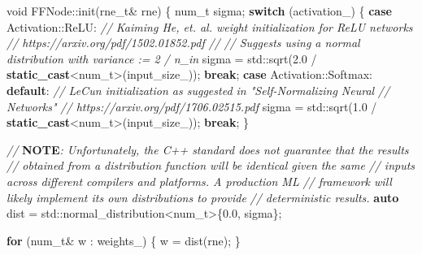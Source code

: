 \documentclass[
]{article}
\newenvironment{Shaded}{}{}
\newcommand{\AlertTok}[1]{\textcolor[rgb]{1.00,0.00,0.00}{\textbf{#1}}}
\newcommand{\BuiltInTok}[1]{#1}
\newcommand{\CommentTok}[1]{\textcolor[rgb]{0.38,0.63,0.69}{\textit{#1}}}
\newcommand{\ControlFlowTok}[1]{\textcolor[rgb]{0.00,0.44,0.13}{\textbf{#1}}}
\newcommand{\DataTypeTok}[1]{\textcolor[rgb]{0.56,0.13,0.00}{#1}}
\newcommand{\FloatTok}[1]{\textcolor[rgb]{0.25,0.63,0.44}{#1}}
\newcommand{\KeywordTok}[1]{\textcolor[rgb]{0.00,0.44,0.13}{\textbf{#1}}}
\newcommand{\NormalTok}[1]{#1}
\newcommand{\VariableTok}[1]{\textcolor[rgb]{0.10,0.09,0.49}{#1}}
\begin{document}
\begin{Shaded}
\begin{Highlighting}[]
\DataTypeTok{void}\NormalTok{ FFNode::init(}\DataTypeTok{rne\_t}\NormalTok{\& rne)}
\NormalTok{\{}
    \DataTypeTok{num\_t}\NormalTok{ sigma;}
    \ControlFlowTok{switch}\NormalTok{ (}\VariableTok{activation\_}\NormalTok{)}
\NormalTok{    \{}
    \ControlFlowTok{case}\NormalTok{ Activation::ReLU:}
        \CommentTok{// Kaiming He, et. al. weight initialization for ReLU networks}
        \CommentTok{// https://arxiv.org/pdf/1502.01852.pdf}
        \CommentTok{//}
        \CommentTok{// Suggests using a normal distribution with variance := 2 / n\_in}
\NormalTok{        sigma = }\BuiltInTok{std::}\NormalTok{sqrt(}\FloatTok{2.0}\NormalTok{ / }\KeywordTok{static\_cast}\NormalTok{\textless{}}\DataTypeTok{num\_t}\NormalTok{\textgreater{}(}\VariableTok{input\_size\_}\NormalTok{));}
        \ControlFlowTok{break}\NormalTok{;}
    \ControlFlowTok{case}\NormalTok{ Activation::Softmax:}
    \ControlFlowTok{default}\NormalTok{:}
        \CommentTok{// LeCun initialization as suggested in "Self{-}Normalizing Neural}
        \CommentTok{// Networks"}
        \CommentTok{// https://arxiv.org/pdf/1706.02515.pdf}
\NormalTok{        sigma = }\BuiltInTok{std::}\NormalTok{sqrt(}\FloatTok{1.0}\NormalTok{ / }\KeywordTok{static\_cast}\NormalTok{\textless{}}\DataTypeTok{num\_t}\NormalTok{\textgreater{}(}\VariableTok{input\_size\_}\NormalTok{));}
        \ControlFlowTok{break}\NormalTok{;}
\NormalTok{    \}}

    \CommentTok{// }\AlertTok{NOTE}\CommentTok{: Unfortunately, the C++ standard does not guarantee that the results}
    \CommentTok{// obtained from a distribution function will be identical given the same}
    \CommentTok{// inputs across different compilers and platforms. A production ML}
    \CommentTok{// framework will likely implement its own distributions to provide}
    \CommentTok{// deterministic results.}
    \KeywordTok{auto}\NormalTok{ dist = }\BuiltInTok{std::}\NormalTok{normal\_distribution\textless{}}\DataTypeTok{num\_t}\NormalTok{\textgreater{}\{}\FloatTok{0.0}\NormalTok{, sigma\};}

    \ControlFlowTok{for}\NormalTok{ (}\DataTypeTok{num\_t}\NormalTok{\& w : }\VariableTok{weights\_}\NormalTok{)}
\NormalTok{    \{}
\NormalTok{        w = dist(rne);}
\NormalTok{    \}}


\end{Highlighting}
\end{Shaded}
\end{document}
